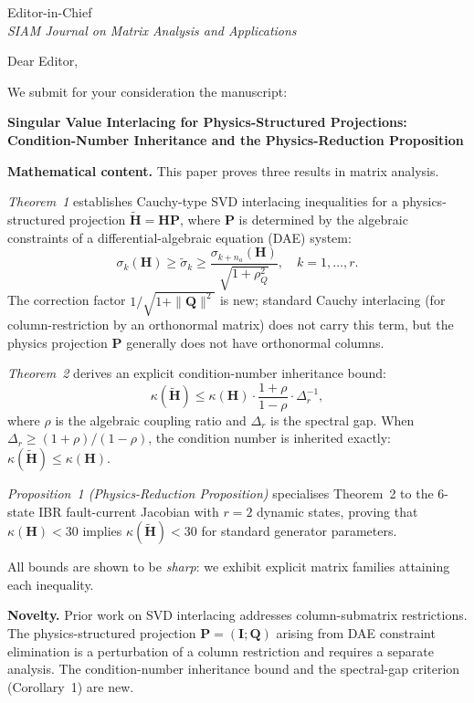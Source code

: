 \documentclass[11pt,a4paper]{letter}
\begin{document}
\begin{letter}{Editor-in-Chief\\
               \textit{SIAM Journal on Matrix Analysis and Applications}}

\opening{Dear Editor,}

We submit for your consideration the manuscript:

\begin{center}
  \textbf{Singular Value Interlacing for Physics-Structured Projections:
  Condition-Number Inheritance and the Physics-Reduction Proposition}
\end{center}

\textbf{Mathematical content.}
This paper proves three results in matrix analysis.

\emph{Theorem~1} establishes Cauchy-type SVD interlacing inequalities
for a physics-structured projection $\tilde{\mathbf{H}} = \mathbf{H}\mathbf{P}$,
where $\mathbf{P}$ is determined by the algebraic constraints of a
differential-algebraic equation (DAE) system:
\[
  \sigma_k(\mathbf{H}) \geq \tilde{\sigma}_k \geq
  \frac{\sigma_{k+n_a}(\mathbf{H})}{\sqrt{1+\rho_Q^2}},
  \quad k = 1,\ldots,r.
\]
The correction factor $1/\sqrt{1+\|\mathbf{Q}\|^2}$ is new; standard
Cauchy interlacing (for column-restriction by an orthonormal matrix)
does not carry this term, but the physics projection $\mathbf{P}$
generally does not have orthonormal columns.

\emph{Theorem~2} derives an explicit condition-number inheritance bound:
\[
  \kappa(\tilde{\mathbf{H}}) \leq
  \kappa(\mathbf{H}) \cdot \frac{1+\rho}{1-\rho} \cdot \Delta_r^{-1},
\]
where $\rho$ is the algebraic coupling ratio and $\Delta_r$ is the
spectral gap.  When $\Delta_r \geq (1+\rho)/(1-\rho)$, the condition
number is inherited exactly: $\kappa(\tilde{\mathbf{H}}) \leq \kappa(\mathbf{H})$.

\emph{Proposition~1 (Physics-Reduction Proposition)} specialises
Theorem~2 to the 6-state IBR fault-current Jacobian with $r=2$
dynamic states, proving that $\kappa(\mathbf{H}) < 30$ implies
$\kappa(\tilde{\mathbf{H}}) < 30$ for standard generator parameters.

All bounds are shown to be \emph{sharp}: we exhibit explicit matrix
families attaining each inequality.

\textbf{Novelty.}
Prior work on SVD interlacing \cite{Thompson1972} addresses
column-submatrix restrictions.  The physics-structured projection
$\mathbf{P} = (\mathbf{I}; \mathbf{Q})$ arising from DAE constraint
elimination is a perturbation of a column restriction and requires a
separate analysis.  The condition-number inheritance bound and
the spectral-gap criterion (Corollary~1) are new.


\end{letter}
\end{document}
